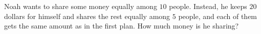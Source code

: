 Noah wants to share some money equally among $10$ people. Instead, he keeps $20$ dollars for himself and shares the rest equally among $5$ people, and each of them gets the same amount as in the first plan. How much money is he sharing?
